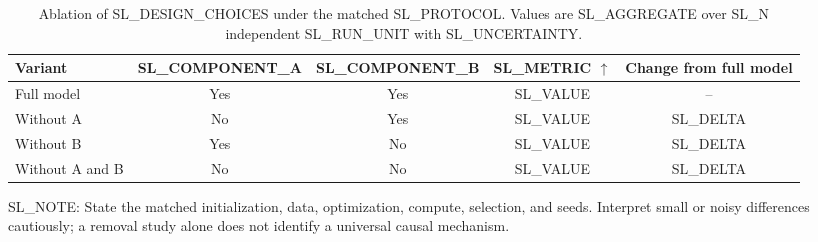\begin{table}[t]
  \centering
  \small
  \caption{Ablation of SL_DESIGN_CHOICES under the matched SL_PROTOCOL. Values
  are SL_AGGREGATE over SL_N independent SL_RUN_UNIT with SL_UNCERTAINTY.}
  \label{tab:SL_LABEL}
  \begin{tabular}{lcccc}
    \toprule
    Variant & SL_COMPONENT_A & SL_COMPONENT_B & SL_METRIC $\uparrow$ &
    Change from full model \\
    \midrule
    Full model       & Yes & Yes & SL_VALUE & -- \\
    Without A        & No  & Yes & SL_VALUE & SL_DELTA \\
    Without B        & Yes & No  & SL_VALUE & SL_DELTA \\
    Without A and B  & No  & No  & SL_VALUE & SL_DELTA \\
    \bottomrule
  \end{tabular}
  \vspace{2pt}

  \parbox{0.98\linewidth}{\footnotesize
  SL_NOTE: State the matched initialization, data, optimization, compute,
  selection, and seeds. Interpret small or noisy differences cautiously; a
  removal study alone does not identify a universal causal mechanism.}
\end{table}
